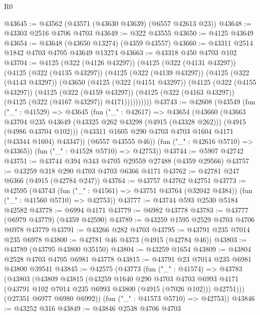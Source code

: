 \begin{lexlean}{R0}
\begin{coremodule}
@43645 := @43562 (@43571 (@43630 @43639) (@6557 @42613 @23))
@43648 := @43303 @2516 @4706 @4703
@43649 := @322 @43555
@43650 := @4125 @43649
@43654 := @43648 (@43650 @13274) (@4359 @43557)
@43660 := @43311 @2514 @1842 @4703 @4705 @43649 @13274
@43663 := @43318 @450 @4703 @102
@43704 := @4125
    (@322 (@4126 @43297))
    (@4125
      (@322 (@4131 @43297))
      (@4125
        (@322 (@4135 @43297))
        (@4125
          (@322 (@4139 @43297))
          (@4125
            (@322 (@4143 @43297))
            (@43650
              (@4125
                (@322 (@4151 @43297))
                (@4125
                  (@322 (@4155 @43297))
                  (@4125
                    (@322 (@4159 @43297))
                    (@4125 (@322 (@4163 @43297)) (@4125 (@322 (@4167 @43297)) @4171))))))))))
@43743 := @42608
    (@43549
      (fun ("_" : @41529) =>
      @43645
        (fun ("_" : @42617) =>
        @43654
          (@43660
            (@43663
              @43704
              @235
              @43649
              (@43325 @262 @43298 (@4915 (@43328 @262)))
              (@4915 (@4986 @43704 @102)))
            (@43311 @1605 @290 @4703 @4703 @1604 @4171 (@43344 @1604) @43347))
          (@6557 @43555 @46))
        (fun ("_" : @42616 @5710) => @43365))
      (fun ("_" : @41528 @5710) => @42753))
@43744 := @5907 @42742
@43751 := @43744 @394 @343 @4705 @29559 @27488 (@4359 @29566)
@43757 := @43259 @318 @290 @4703 @4703 @6366 @4171
@43762 := @42781 @247 @6366 (@4915 (@42784 @247))
@43764 := @43757 @43762 @42751
@43773 := @42595
    (@43743
      (fun ("_" : @41561) => @43751 @43764 (@32042 @4384))
      (fun ("_" : @41560 @5710) => @42753))
@43777 := @43744 @593 @2530 @5184 @42582
@43778 := @6994 @4171
@43779 := @6982 @43778
@43783 := @43777 (@6979 @43779) (@4359 @42590)
@43789 := @43259 @1595 @2529 @4703 @4706 @6978 @43779
@43791 := @43266 @282 @4703
@43795 := @43791 @235 @7014 @235 @6978
@43800 := @42781 @46 @4373 (@4915 (@42784 @46))
@43803 := @43789 (@43795 @43800 @35150)
@43804 := @43259 @1654
@43809 := @43804 @2528 @4703 @4705 @6981 @43778
@43815 := @43791 @23 @7014 @235 @6981 @43800 @39541
@43845 := @42575
    (@43773
      (fun ("_" : @41574) =>
      @43783
        (@43803
          (@43809
            @43815
            (@43259
              @1640
              @290
              @4703
              @4703
              @6993
              @4171
              (@43791 @102 @7014 @235 @6993 @43800 (@4915 (@7026 @102)))
              @42751)))
        (@27351 @6977 @6980 @6992))
      (fun ("_" : @41573 @5710) => @42753))
@43846 := @43252 @316
@43849 := @43846 @2538 @4706 @4703

\end{coremodule}
\end{lexlean}
